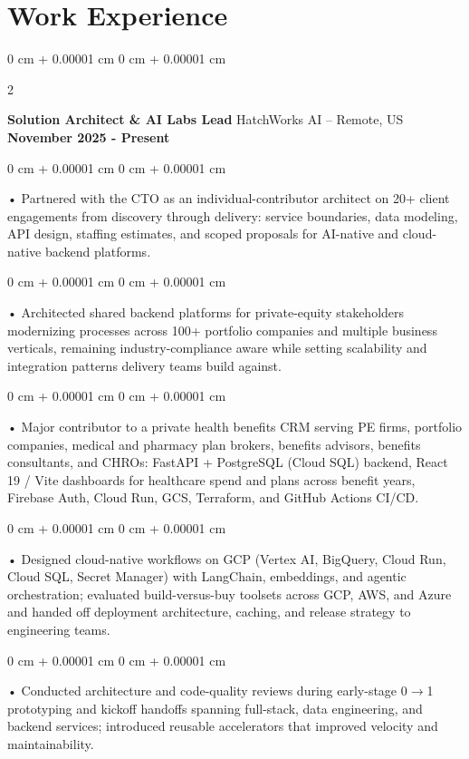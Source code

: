 \documentclass[10pt, letterpaper]{article}
\newenvironment{onecolentry}{
    \begin{adjustwidth}{
        0 cm + 0.00001 cm
    }{
        0 cm + 0.00001 cm
    }
}{
    \end{adjustwidth}
} %
\newenvironment{twocolentry}[2][]{
    \onecolentry
    \def\secondColumn{#2}
    \setcolumnwidth{\fill, 4.5 cm}
    \begin{paracol}{2}
}{
    \switchcolumn \raggedleft \secondColumn
    \end{paracol}
    \endonecolentry
} %
\begin{document}
    \vspace{0.5cm}
    \section{Work Experience}
        \vspace{0.1cm}

        \begin{twocolentry}{
            \textbf{November 2025 - Present}
        }
            \textbf{Solution Architect \& AI Labs Lead} HatchWorks AI -- Remote, US\end{twocolentry}

        \begin{onecolentry}
             • Partnered with the CTO as an individual-contributor architect on 20+ client engagements from discovery through delivery: service boundaries, data modeling, API design, staffing estimates, and scoped proposals for AI-native and cloud-native backend platforms.
        \end{onecolentry}
        \begin{onecolentry}
             • Architected shared backend platforms for private-equity stakeholders modernizing processes across 100+ portfolio companies and multiple business verticals, remaining industry-compliance aware while setting scalability and integration patterns delivery teams build against.
        \end{onecolentry}
        \begin{onecolentry}
             • Major contributor to a private health benefits CRM serving PE firms, portfolio companies, medical and pharmacy plan brokers, benefits advisors, benefits consultants, and CHROs: FastAPI + PostgreSQL (Cloud SQL) backend, React 19 / Vite dashboards for healthcare spend and plans across benefit years, Firebase Auth, Cloud Run, GCS, Terraform, and GitHub Actions CI/CD.
        \end{onecolentry}
        \begin{onecolentry}
             • Designed cloud-native workflows on GCP (Vertex AI, BigQuery, Cloud Run, Cloud SQL, Secret Manager) with LangChain, embeddings, and agentic orchestration; evaluated build-versus-buy toolsets across GCP, AWS, and Azure and handed off deployment architecture, caching, and release strategy to engineering teams.
        \end{onecolentry}
        \begin{onecolentry}
             • Conducted architecture and code-quality reviews during early-stage 0$\rightarrow$1 prototyping and kickoff handoffs spanning full-stack, data engineering, and backend services; introduced reusable accelerators that improved velocity and maintainability.
        \end{onecolentry}
\end{document}
